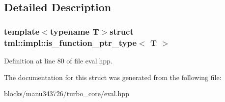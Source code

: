\subsection{Detailed Description}
\subsubsection*{template$<$typename T$>$struct tml\+::impl\+::is\+\_\+function\+\_\+ptr\+\_\+type$<$ T $>$}



Definition at line 80 of file eval.\+hpp.



The documentation for this struct was generated from the following file\+:\begin{DoxyCompactItemize}
\item 
blocks/manu343726/turbo\+\_\+core/eval.\+hpp\end{DoxyCompactItemize}
